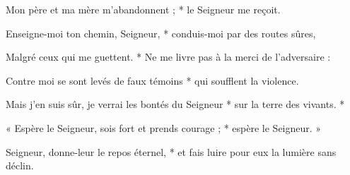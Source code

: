 \item Mon père et ma mère m'abandonnent ; * le Seigneur me reçoit.

\item Enseigne-moi ton chemin, Seigneur, * conduis-moi par des routes sûres,

\item Malgré ceux qui me guettent. * Ne me livre pas à la merci de l'adversaire :

\item Contre moi se sont levés de faux témoins * qui soufflent la violence.

\item Mais j'en suis sûr, je verrai les bontés du Seigneur * sur la terre des vivants. *

\item « Espère le Seigneur, sois fort et prends courage ; * espère le Seigneur. »

\item Seigneur, donne-leur le repos éternel, * et fais luire pour eux la lumière sans déclin.